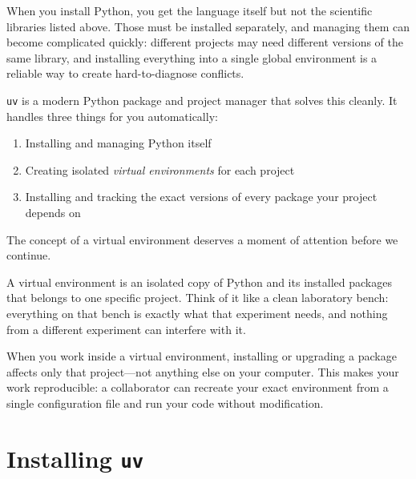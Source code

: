 \documentclass[nobib]{tufte-book}
\begin{document}
When you install Python, you get the language itself but not the scientific
libraries listed above.
Those must be installed separately, and managing them can become complicated
quickly: different projects may need different versions of the same library,
and installing everything into a single global environment is a reliable way
to create hard-to-diagnose conflicts.

\texttt{uv} is a modern Python package and project manager that solves this
cleanly.
It handles three things for you automatically:

\begin{enumerate}
    \item Installing and managing Python itself
    \item Creating isolated \emph{virtual environments} for each project
    \item Installing and tracking the exact versions of every package your
          project depends on
\end{enumerate}

The concept of a virtual environment deserves a moment of attention before
we continue.

\begin{conceptbox}[title={What is a Virtual Environment?}]
A virtual environment is an isolated copy of Python and its installed packages
that belongs to one specific project.
Think of it like a clean laboratory bench: everything on that bench is exactly
what that experiment needs, and nothing from a different experiment can
interfere with it.

When you work inside a virtual environment, installing or upgrading a package
affects only that project---not anything else on your computer.
This makes your work reproducible: a collaborator can recreate your exact
environment from a single configuration file and run your code without
modification.
\end{conceptbox}

\section{Installing \texttt{uv}}
\end{document}
